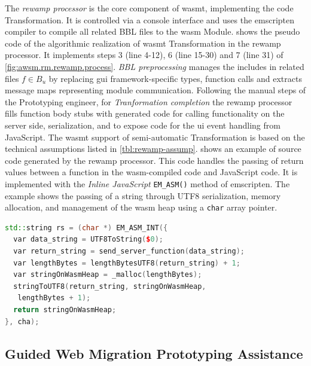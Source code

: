 The \emph{\gls{rewamp} processor} is the core component of \gls{wasmt}, implementing the code \gls{Transformation}.
It is controlled via a console interface and uses the emscripten compiler to compile all related BBL files to the \gls{wasm} Module.
 shows the pseudo code of the algorithmic realization of \gls{wasmt} \gls{Transformation} in the \gls{rewamp} processor.
It implements steps 3 (line 4-12), 6 (line 15-30) and 7 (line 31) of \cref{fig:awsm.rm.rewamp.process}.
\emph{BBL preprocessing} manages the includes in related files \(f \in B_u\) by replacing \gls{gui} framework-specific types, function calls and extracts message maps representing module communication.
Following the manual steps of the Prototyping engineer, for \emph{Tranformation completion} the \gls{rewamp} processor fills function body stubs with generated code for calling functionality on the server side, serialization, and to expose code for the \gls{ui} event handling from JavaScript.
The \gls{wasmt} support of semi-automatic \gls{Transformation} is based on the technical assumptions listed in \cref{tbl:rewamp-assump}.
 shows an example of source code generated by the \gls{rewamp} processor.
This code handles the passing of return values between a \legacy function in the \gls{wasm}-compiled \cpp code and JavaScript code.
It is implemented with the \emph{Inline JavaScript} \texttt{EM\_ASM()} method of emscripten.
The example shows the passing of a string through UTF8 serialization, memory allocation, and management of the \gls{wasm} heap using a \texttt{char} array pointer.

\begin{lstlisting}[language=C++, captionpos=t, caption=Example of Code Generated by ReWaMP to Handle Passing of Return Value from Function Call, label=lst:rewampreturns,breaklines=true,postbreak=\mbox{$\hookrightarrow$\space},]
std::string rs = (char *) EM_ASM_INT({
  var data_string = UTF8ToString($0);
  var return_string = send_server_function(data_string);
  var lengthBytes = lengthBytesUTF8(return_string) + 1;
  var stringOnWasmHeap = _malloc(lengthBytes);
  stringToUTF8(return_string, stringOnWasmHeap,
   lengthBytes + 1);
  return stringOnWasmHeap;
}, cha);
\end{lstlisting}

\vspace{-10pt}
\hypertarget{sec:rwmpa}{%
\subsection{Guided Web Migration Prototyping Assistance}\label{sec:rwmpa}}
\vspace{10pt}

